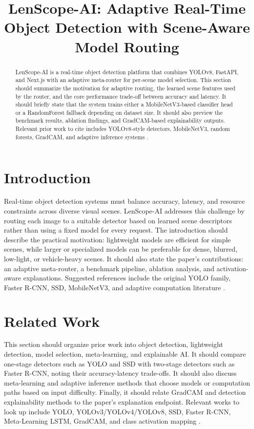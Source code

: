 \documentclass[conference]{IEEEtran}
\title{LenScope-AI: Adaptive Real-Time Object Detection with Scene-Aware Model Routing}
\author{
\IEEEauthorblockN{Author Name}
\IEEEauthorblockA{
Department or Laboratory\\
Institution Name\\
City, Country\\
email@example.com}
}
\begin{document}
\maketitle

\begin{abstract}
LenScope-AI is a real-time object detection platform that combines YOLOv8, FastAPI, and Next.js with an adaptive meta-router for per-scene model selection. This section should summarize the motivation for adaptive routing, the learned scene features used by the router, and the core performance trade-off between accuracy and latency. It should briefly state that the system trains either a MobileNetV3-based classifier head or a RandomForest fallback depending on dataset size. It should also preview the benchmark results, ablation findings, and GradCAM-based explainability outputs. Relevant prior work to cite includes YOLOv8-style detectors, MobileNetV3, random forests, GradCAM, and adaptive inference systems \cite{redmon2016yolo,jocher2023yolov8,howard2019mobilenetv3,selvaraju2017gradcam,breiman2001random}.
\end{abstract}

\section{Introduction}
Real-time object detection systems must balance accuracy, latency, and resource constraints across diverse visual scenes. LenScope-AI addresses this challenge by routing each image to a suitable detector based on learned scene descriptors rather than using a fixed model for every request. The introduction should describe the practical motivation: lightweight models are efficient for simple scenes, while larger or specialized models can be preferable for dense, blurred, low-light, or vehicle-heavy scenes. It should also state the paper's contributions: an adaptive meta-router, a benchmark pipeline, ablation analysis, and activation-aware explanations. Suggested references include the original YOLO family, Faster R-CNN, SSD, MobileNetV3, and adaptive computation literature \cite{redmon2016yolo,ren2015fasterrcnn,liu2016ssd,howard2019mobilenetv3,graves2016adaptive}.

\section{Related Work}
This section should organize prior work into object detection, lightweight detection, model selection, meta-learning, and explainable AI. It should compare one-stage detectors such as YOLO and SSD with two-stage detectors such as Faster R-CNN, noting their accuracy-latency trade-offs. It should also discuss meta-learning and adaptive inference methods that choose models or computation paths based on input difficulty. Finally, it should relate GradCAM and detection explainability methods to the paper's explanation endpoint. Relevant works to look up include YOLO, YOLOv3/YOLOv4/YOLOv8, SSD, Faster R-CNN, Meta-Learning LSTM, GradCAM, and class activation mapping \cite{redmon2016yolo,redmon2018yolov3,bochkovskiy2020yolov4,liu2016ssd,ren2015fasterrcnn}.
\end{document}
